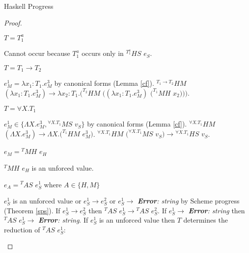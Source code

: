\begin{theorem}{Haskell Progress}
\begin{proof}
\begin{case}
\begin{subcase}
\end{subcase}

\begin{subcase}

$T=T_{1}^{a}$

Cannot occur because $T_{1}^{a}$ occurs only in $^{T_{1}^{a}}HS$ $e_{S}$.

\end{subcase}

\begin{subcase}

$T=T_{1}\rightarrow T_{2}$

$e_{M}^{1}=\lambda x_{1}:T_{1}.e_{M}^{3}$ by canonical forms (Lemma \ref{cf}).  $^{T_{1}\rightarrow T_{2}}HM$ $(\lambda x_{1}:T_{1}.e_{M}^{3})\rightarrow\lambda x_{2}:T_{1}.(^{T_{2}}HM$ $((\lambda x_{1}:T_{1}.e_{M}^{3})$ $(^{T_{1}}MH$ $x_{2})))$.

\end{subcase}

\begin{subcase}

$T=\forall X.T_{1}$

$e_{M}^{1}\in\lbrace\Lambda X.e_{M}^{3},{^{\forall X.T_{1}}M}S$ $v_{S}\rbrace$ by canonical forms (Lemma \ref{cf}).  $^{\forall X.T_{1}}HM$ $(\Lambda X.e_{M}^{3})\rightarrow\Lambda X.(^{T_{1}}HM$ $e_{M}^{3})$.  $^{\forall X.T_{1}}HM$ $(^{\forall X.T_{1}}MS$ $v_{S})\rightarrow{^{\forall X.T_{1}}H}S$ $v_{S}$.

\end{subcase}

\end{case}


\begin{case}

$e_{M}={^{T}M}H$ $e_{H}$

$^{T}MH$ $e_{H}$ is an unforced value.

\end{case}


\begin{case}

$e_{A}={^{T}A}S$ $e_{S}^{1}$ where $A\in\lbrace H,M\rbrace$

$e_{S}^{1}$ is an unforced value or $e_{S}^{1}\rightarrow e_{S}^{2}$ or $e_{S}^{1}\rightarrow$ \emph{\textbf{Error}: string} by Scheme progress (Theorem \ref{sps}).  If $e_{S}^{1}\rightarrow e_{S}^{2}$ then $^{T}AS$ $e_{S}^{1}\rightarrow{^{T}A}S$ $e_{S}^{2}$.  If $e_{S}^{1}\rightarrow$ \emph{\textbf{Error}: string} then $^{T}AS$ $e_{S}^{1}\rightarrow$ \emph{\textbf{Error}: string}.  If $e_{S}^{1}$ is an unforced value then $T$ determines the reduction of $^{T}AS$ $e_{S}^{1}$:


\end{case}
\end{proof}
\end{theorem}
